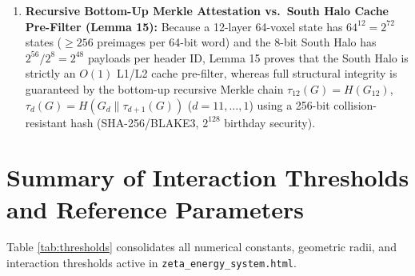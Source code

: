 \documentclass[11pt, a4paper]{article}
\begin{document}
\begin{enumerate}
    In the canonical Fifteen Lemmas bit layout (Table 4 of \textit{Fifteen Lemmas}), Bits $[63:61]$ hold the 3-bit cycle step $k$, Bits $[60:58]$ hold the 3-bit wheel unit $u \in \{0..7\}$, Bits $[57:56]$ hold the 2-bit structure selector ($I, A, \bar{A}, E$ or $\mathcal{M}^{(1)}..\mathcal{M}^{(4)}$), Bits $[55:48]$ hold the Gate Byte, Bits $[47:44]$ hold the step-multiplexed index ($s \in \mathbb{Z}/9$, half-cube $l \in \{0..15\}$, ghost index $0..6$, or $\mathfrak{aff}(3)$ coordinate), Bits $[43:40]$ hold the 4-bit Form ID ($0..15$), Bits $[39:36]$ hold the stream slot ($0..15$, forming the 6-bit Stream ID with Bits $[57:56]$), and Bits $[35:32]$ hold the Scale Register ($2^l, F_m,$ or geodesic frequency $\nu$). Forms $4$--$15$ name deterministic geometric codex shapes: Form 4 (64-cell Voxel Cube $V$), Form 5 (8-cell Core $K$), Form 6 (Stella Octangula $\Delta_1 \cup -\Delta_1$), Form 7 (12-point Cuboctahedron), Form 8 (Geodesic Icosahedron of $10\nu^2+2$ points), Form 9 (24 Hurwitz Units), Form 10 (12-element Binary Dihedral Group $2D_3$), Form 11 (9-Ray Circle $x(s)$), Form 12 (7 Hyperbolic $\{4,3,5\}$ Cells), Form 13 ($F_m$ Golden Circle Points), Form 14 (8 Wheel Units mod 30), and Form 15 (Merkle-attested user codex).
    \item \textbf{Recursive Bottom-Up Merkle Attestation vs.\ South Halo Cache Pre-Filter (Lemma 15):}
    Because a 12-layer 64-voxel state has $64^{12} = 2^{72}$ states ($\ge 256$ preimages per 64-bit word) and the 8-bit South Halo has $2^{56}/2^8 = 2^{48}$ payloads per header ID, Lemma 15 proves that the South Halo is strictly an $O(1)$ L1/L2 cache pre-filter, whereas full structural integrity is guaranteed by the bottom-up recursive Merkle chain $\tau_{12}(G) = H(G_{12})$, $\tau_d(G) = H(G_d \parallel \tau_{d+1}(G))$ ($d = 11,\dots,1$) using a 256-bit collision-resistant hash (SHA-256/BLAKE3, $2^{128}$ birthday security).
\end{enumerate}

\section{Summary of Interaction Thresholds and Reference Parameters}

Table \ref{tab:thresholds} consolidates all numerical constants, geometric radii, and interaction thresholds active in \texttt{zeta\_energy\_system.html}.
\end{document}
